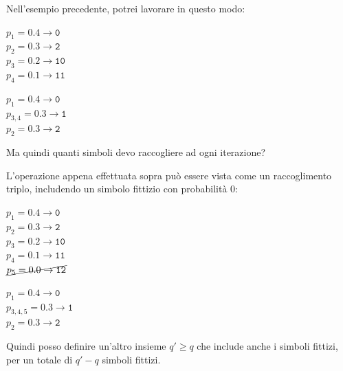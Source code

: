 Nell'esempio precedente, potrei lavorare in questo modo:

\begin{multicols}{2}
	\begin{center}
		$p_1 = 0.4 \rightarrow \texttt{0}$\\
		$p_2 = 0.3 \rightarrow \texttt{2}$\\
		$p_3 = 0.2 \rightarrow \texttt{10}$\\
		$p_4 = 0.1 \rightarrow \texttt{11}$\\
	\end{center}
	
	\columnbreak
	
	\begin{center}
		$p_1 = 0.4 \rightarrow \texttt{0}$\\
		$p_{3,4} = 0.3 \rightarrow \texttt{1}$\\
		$p_2 = 0.3 \rightarrow \texttt{2}$\\
	\end{center}  		
\end{multicols}

Ma quindi quanti simboli devo raccogliere ad ogni iterazione?

L'operazione appena effettuata sopra può essere vista come un raccoglimento triplo, includendo un simbolo fittizio con probabilità 0:


\begin{multicols}{2}
	\begin{center}
		$p_1 = 0.4 \rightarrow \texttt{0}$\\
		$p_2 = 0.3 \rightarrow \texttt{2}$\\
		$p_3 = 0.2 \rightarrow \texttt{10}$\\
		$p_4 = 0.1 \rightarrow \texttt{11}$\\
		$\cancel{p_5 = 0.0 \rightarrow \texttt{12}}$
	\end{center}
	
	\columnbreak
	
	\begin{center}
		$p_1 = 0.4 \rightarrow \texttt{0}$\\
		$p_{3,4,5} = 0.3 \rightarrow \texttt{1}$\\
		$p_2 = 0.3 \rightarrow \texttt{2}$\\
	\end{center}  		
\end{multicols}

Quindi posso definire un'altro insieme $q' \geq q$ che include anche i simboli fittizi, per un totale di $q'-q$ simboli fittizi.

